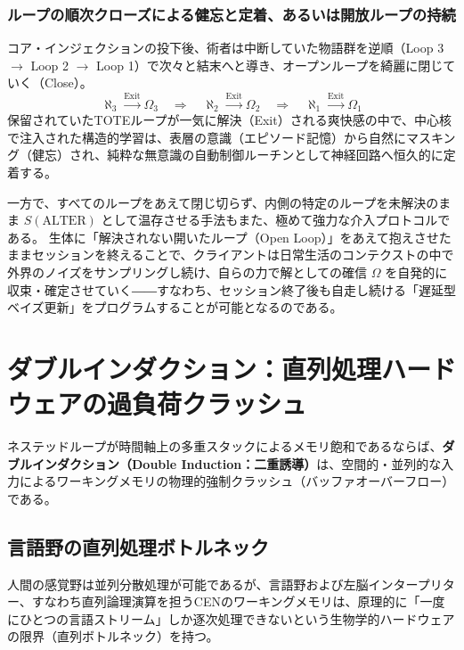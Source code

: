 \subsubsection{ループの順次クローズによる健忘と定着、あるいは開放ループの持続}
コア・インジェクションの投下後、術者は中断していた物語群を逆順（Loop 3 $\to$ Loop 2 $\to$ Loop 1）で次々と結末へと導き、オープンループを綺麗に閉じていく（Close）。
\begin{equation}
    \aleph_3 \xrightarrow{\text{Exit}} \Omega_3 \quad \Longrightarrow \quad \aleph_2 \xrightarrow{\text{Exit}} \Omega_2 \quad \Longrightarrow \quad \aleph_1 \xrightarrow{\text{Exit}} \Omega_1
\end{equation}
保留されていたTOTEループが一気に解決（Exit）される爽快感の中で、中心核で注入された構造的学習は、表層の意識（エピソード記憶）から自然にマスキング（健忘）され、純粋な無意識の自動制御ルーチンとして神経回路へ恒久的に定着する。

一方で、すべてのループをあえて閉じ切らず、内側の特定のループを未解決のまま $S(\mathrm{ALTER})$ として温存させる手法もまた、極めて強力な介入プロトコルである。
生体に「解決されない開いたループ（Open Loop）」をあえて抱えさせたままセッションを終えることで、クライアントは日常生活のコンテクストの中で外界のノイズをサンプリングし続け、自らの力で解としての確信 $\Omega$ を自発的に収束・確定させていく――すなわち、セッション終了後も自走し続ける「遅延型ベイズ更新」をプログラムすることが可能となるのである。

\section{ダブルインダクション：直列処理ハードウェアの過負荷クラッシュ}

ネステッドループが時間軸上の多重スタックによるメモリ飽和であるならば、\textbf{ダブルインダクション（Double Induction：二重誘導）}は、空間的・並列的な入力によるワーキングメモリの物理的強制クラッシュ（バッファオーバーフロー）である。

\subsection{言語野の直列処理ボトルネック}
人間の感覚野は並列分散処理が可能であるが、言語野および左脳インタープリター、すなわち直列論理演算を担うCENのワーキングメモリは、原理的に「一度にひとつの言語ストリーム」しか逐次処理できないという生物学的ハードウェアの限界（直列ボトルネック）を持つ。

